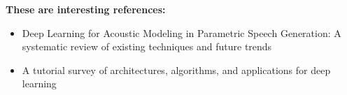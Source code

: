 \vspace{1em}

\textbf{These are interesting references:}
\vspace{1em}
\begin{itemize}[leftmargin=10pt]
	\item Deep Learning for Acoustic Modeling in Parametric Speech Generation: A systematic review of existing techniques and future trends \cite{ling:deep}
	\item A tutorial survey of architectures, algorithms, and applications for deep learning \cite{li:survey}
\end{itemize}

\clearpage